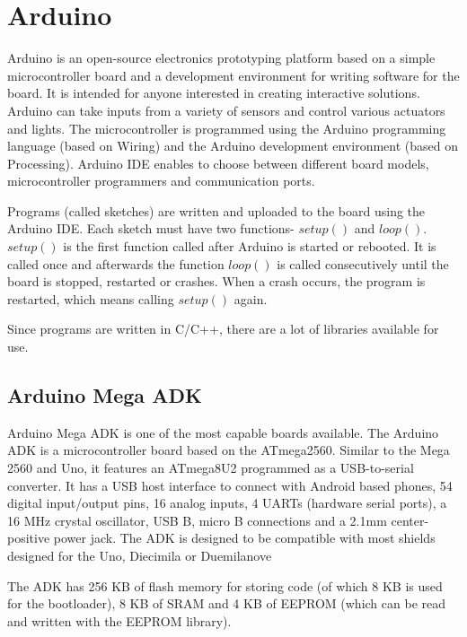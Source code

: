 \section{Arduino}

Arduino \cite{arduinoHome} is an open-source electronics prototyping platform based on a simple microcontroller board and a development environment for writing software for the board. It is intended for anyone interested in creating interactive solutions. Arduino can take inputs from a variety of sensors and control various actuators and lights. The microcontroller is programmed using the Arduino programming language (based on Wiring) and the Arduino development environment (based on Processing). Arduino IDE enables to choose between different board models, microcontroller programmers and communication ports. 

Programs (called sketches) are written and uploaded to the board using the Arduino IDE. Each sketch must have two functions- $setup()$ and $loop()$. $setup()$ is the first function called after Arduino is started or rebooted. It is called once and afterwards the function $loop()$ is called consecutively until the board is stopped, restarted or crashes. When a crash occurs, the program is restarted, which means calling $setup()$ again. 

Since programs are written in C/C++, there are a lot of libraries available for use. 

\subsection{Arduino Mega ADK}

Arduino Mega ADK \cite{megaAdk} is one of the most capable boards available. 
The Arduino ADK is a microcontroller board based on the ATmega2560. Similar to the Mega 2560 and Uno, it features an ATmega8U2 programmed as a USB-to-serial converter. It has a USB host interface to connect with Android based phones, 54 digital input/output pins, 16 analog inputs, 4 UARTs (hardware serial ports), a 16 MHz crystal oscillator, USB B, micro B connections and a 2.1mm center-positive power jack. The ADK is designed to be compatible with most shields designed for the Uno, Diecimila or Duemilanove

The ADK has 256 KB of flash memory for storing code (of which 8 KB is used for the bootloader), 8 KB of SRAM and 4 KB of EEPROM (which can be read and written with the EEPROM library).

